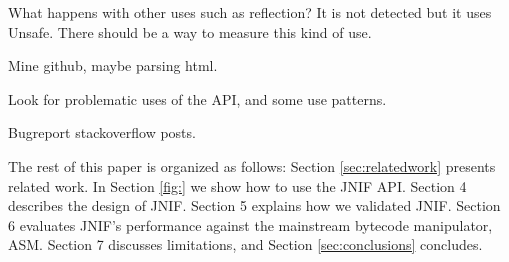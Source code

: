 
What happens with other uses such as reflection? It is not detected but it uses Unsafe. There should be a way to measure this kind of use.

Mine github, maybe parsing html.

Look for problematic uses of the API, and some use patterns.

Bugreport stackoverflow posts.

The rest of this paper is organized as follows:
Section \ref{sec:relatedwork} presents related work.
In Section \ref{fig:} we show how to use the JNIF API.
Section 4 describes the design of JNIF.
Section 5 explains how we validated JNIF.
Section 6 evaluates JNIF’s performance against the mainstream bytecode manipulator, ASM.
Section 7 discusses limitations, and Section \ref{sec:conclusions} concludes.
